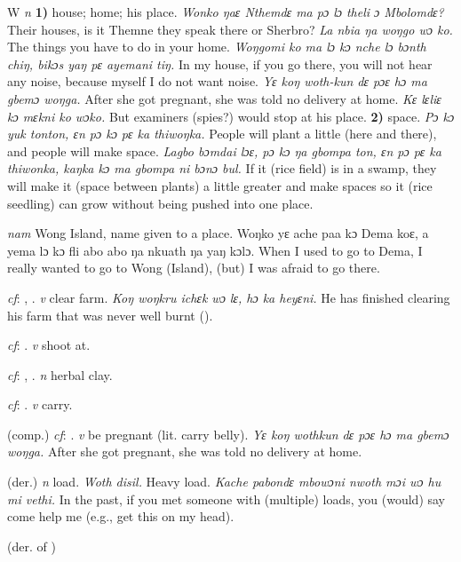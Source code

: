 \begin{letter}{W}
 \textit{n} \textbf{1)} house; home; his place. \textit{Wonko ŋaɛ Nthemdɛ ma pɔ lɔ theli ɔ Mbolomdɛ?} Their houses, is it Themne they speak there or Sherbro? \textit{La nbia ŋa woŋgo wɔ ko.} The things you have to do in your home. \textit{Woŋgomi ko ma lɔ kɔ nche lɔ bɔnth chiŋ, bikɔs yaŋ pɛ ayemani tiŋ.} In my house, if you go there, you will not hear any noise, because myself I do not want noise. \textit{Yɛ koŋ woth-kun dɛ pɔɛ hɔ ma gbemɔ woŋga.} After she got pregnant, she was told no delivery at home. \textit{Kɛ lɛliɛ kɔ mɛkni ko wɔko.} But examiners (spies?) would stop at his place. \textbf{2)} space. \textit{Pɔ kɔ yuk tonton, ɛn pɔ kɔ pɛ ka thiwoŋka.} People will plant a little (here and there), and people will make space. \textit{Lagbo bɔmdai lɔɛ, pɔ kɔ ŋa gbompa ton, ɛn pɔ pɛ ka thiwonka, kaŋka kɔ ma gbompa ni bɔnɔ bul.} If it (rice field) is in a swamp, they will make it (space between plants) a little greater and make spaces so it (rice seedling) can grow without being pushed into one place. 

 \textit{nam} Wong Island, name given to a place. Woŋko yɛ ache paa kɔ Dema koɛ, a yema lɔ kɔ fli abo abo ŋa nkuath ŋa yaŋ kɔlɔ. When I used to go to Dema, I really wanted to go to Wong (Island), (but) I was afraid to go there. 

 \textit{cf}: , . \textit{v} clear farm. \textit{Koŋ woŋkru ichɛk wɔ lɛ, hɔ ka heyɛni.} He has finished clearing his farm that was never well burnt (\citealt{Pichl1967}). 

 \textit{cf}: . \textit{v} shoot at.

 \textit{cf}: , . \textit{n} herbal clay.

 \textit{cf}: . \textit{v} carry.

 (comp.) \textit{cf}: . \textit{v} be pregnant (lit. carry belly). \textit{Yɛ koŋ wothkun dɛ pɔɛ hɔ ma gbemɔ woŋga.} After she got pregnant, she was told no delivery at home.

 (der.) \textit{n} load. \textit{Woth disil.} Heavy load. \textit{Kache pabondɛ mbowɔni nwoth mɔi wɔ hu mi vethi.} In the past, if you met someone with (multiple) loads, you (would) say come help me (e.g., get this on my head).

 (der. of ) 


\end{letter}
